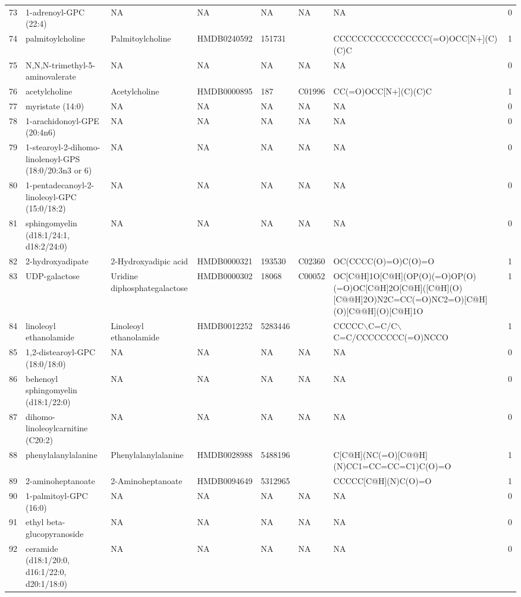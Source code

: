 \documentclass[a4paper]{article}
\begin{document}
\begin{longtable}{rlllllll}
  73 & 1-adrenoyl-GPC (22:4) & NA & NA & NA & NA & NA & 0 \\ 
  74 & palmitoylcholine & Palmitoylcholine & HMDB0240592 & 151731 &  & CCCCCCCCCCCCCCCC(=O)OCC[N+](C)(C)C & 1 \\ 
  75 & N,N,N-trimethyl-5-aminovalerate & NA & NA & NA & NA & NA & 0 \\ 
  76 & acetylcholine & Acetylcholine & HMDB0000895 & 187 & C01996 & CC(=O)OCC[N+](C)(C)C & 1 \\ 
  77 & myristate (14:0) & NA & NA & NA & NA & NA & 0 \\ 
  78 & 1-arachidonoyl-GPE (20:4n6) & NA & NA & NA & NA & NA & 0 \\ 
  79 & 1-stearoyl-2-dihomo-linolenoyl-GPS (18:0/20:3n3 or 6) & NA & NA & NA & NA & NA & 0 \\ 
  80 & 1-pentadecanoyl-2-linoleoyl-GPC (15:0/18:2) & NA & NA & NA & NA & NA & 0 \\ 
  81 & sphingomyelin (d18:1/24:1, d18:2/24:0) & NA & NA & NA & NA & NA & 0 \\ 
  82 & 2-hydroxyadipate & 2-Hydroxyadipic acid & HMDB0000321 & 193530 & C02360 & OC(CCCC(O)=O)C(O)=O & 1 \\ 
  83 & UDP-galactose & Uridine diphosphategalactose & HMDB0000302 & 18068 & C00052 & OC[C@H]1O[C@H](OP(O)(=O)OP(O)(=O)OC[C@H]2O[C@H]([C@H](O)[C@@H]2O)N2C=CC(=O)NC2=O)[C@H](O)[C@@H](O)[C@H]1O & 1 \\ 
  84 & linoleoyl ethanolamide & Linoleoyl ethanolamide & HMDB0012252 & 5283446 &  & CCCCC$\backslash$C=C/C$\backslash$C=C/CCCCCCCC(=O)NCCO & 1 \\ 
  85 & 1,2-distearoyl-GPC (18:0/18:0) & NA & NA & NA & NA & NA & 0 \\ 
  86 & behenoyl sphingomyelin (d18:1/22:0) & NA & NA & NA & NA & NA & 0 \\ 
  87 & dihomo-linoleoylcarnitine (C20:2) & NA & NA & NA & NA & NA & 0 \\ 
  88 & phenylalanylalanine & Phenylalanylalanine & HMDB0028988 & 5488196 &  & C[C@H](NC(=O)[C@@H](N)CC1=CC=CC=C1)C(O)=O & 1 \\ 
  89 & 2-aminoheptanoate & 2-Aminoheptanoate & HMDB0094649 & 5312965 &  & CCCCC[C@H](N)C(O)=O & 1 \\ 
  90 & 1-palmitoyl-GPC (16:0) & NA & NA & NA & NA & NA & 0 \\ 
  91 & ethyl beta-glucopyranoside & NA & NA & NA & NA & NA & 0 \\ 
  92 & ceramide (d18:1/20:0, d16:1/22:0, d20:1/18:0) & NA & NA & NA & NA & NA & 0 \\ 

\end{longtable}
\end{document}
